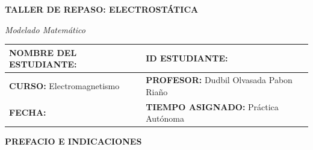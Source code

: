 \documentclass[11pt,letterpaper]{article}
\newcommand{\NombreCurso}{Electromagnetismo}
\newcommand{\NombreProfesor}{Dudbil Olvasada Pabon Riaño}
\newcommand{\FechaExamen}{}
\newcommand{\TiempoExamen}{Práctica Autónoma}
\newcommand{\TituloEvaluacion}{TALLER DE REPASO: ELECTROSTÁTICA}
\begin{document}
\vspace*{1cm}
\begin{center}
  {\fontsize{20}{24}\selectfont\bfseries\color{unabBlue}\TituloEvaluacion}\par
  \vspace{0.3cm}
  {\large\textit{Modelado Matemático}}\par
\end{center}
\vspace{1cm}

\noindent
{}
\begin{tabularx}{\textwidth}{|>{\raggedright\arraybackslash}X|>{\raggedright\arraybackslash}X|}
\hline
\rowcolor{unabBlue!10}
\textbf{\color{unabBlue}NOMBRE DEL ESTUDIANTE:} & \textbf{\color{unabBlue}ID ESTUDIANTE:} \\[15pt]
\hline
\textbf{\color{unabBlue}CURSO:} \NombreCurso & \textbf{\color{unabBlue}PROFESOR:} \NombreProfesor \\
\hline
\textbf{\color{unabBlue}FECHA:} \FechaExamen & \textbf{\color{unabBlue}TIEMPO ASIGNADO:} \TiempoExamen \\
\hline
\end{tabularx}

\vspace{1cm}

{\fontsize{14}{17}\selectfont\bfseries\color{unabBlue} PREFACIO E INDICACIONES}
\end{document}
